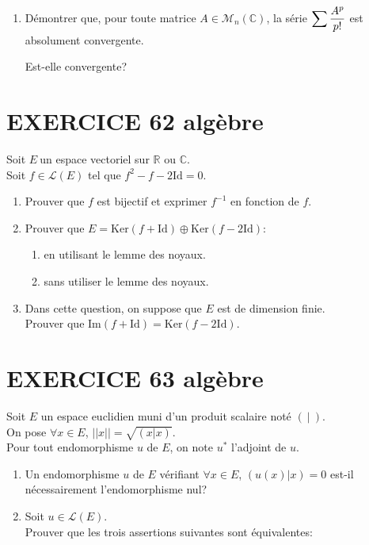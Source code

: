 \documentclass[10pt,oneside]{article}
\begin{document}
\begin{flushleft}
\begin{enumerate}
\item Démontrer que, pour toute matrice $A\in \mathcal{M}_{n}\left( \mathbb{C}\right)$, la s\'{e}rie $\displaystyle\displaystyle\sum \dfrac{A^{p}}{p!}$ est absolument convergente.

Est-elle convergente?
\end{enumerate}
		


\section*{EXERCICE 62 \: algèbre }

Soit $E\ $un espace vectoriel sur $\mathbb{R}$ ou $\mathbb{C}$.\\
Soit $f\in\mathcal{L}(E)$ tel que $f^2-f-2\mathrm{Id}=0$.\\

\begin{enumerate}
\item 
 Prouver que $f$ est bijectif et exprimer $f^{-1}$ en fonction de $f$.\\
\item
Prouver que $E=\mathrm{Ker} (f+\mathrm{Id})\oplus\mathrm{Ker}(f-2\mathrm{Id})$:
\begin{enumerate}
\item
en utilisant le lemme des noyaux.
\item
sans utiliser le lemme des noyaux.
\end{enumerate}
\item
Dans cette question, on suppose que $E$ est de dimension finie.\\
Prouver que $\mathrm{Im}(f+\mathrm{Id})=\mathrm{Ker}(f-2\mathrm{Id})$.
\end{enumerate}
\section*{EXERCICE 63 \: algèbre }


Soit $E$ un espace euclidien muni d'un produit scalaire noté $(\:|\:)$.\\
On pose $\forall x\in E$, $||x||=\sqrt{(x|x)}$.\\
Pour tout endomorphisme $u$ de $E$, on note $u^*$ l'adjoint de $u$.
\begin{enumerate}
\item

Un endomorphisme $u$ de $E$ vérifiant $\forall x\in E$, $(u(x)|x)=0$ est-il nécessairement l'endomorphisme nul?
\item
Soit $u\in \mathcal{L}(E)$.\\
Prouver que les trois assertions suivantes sont équivalentes:\\


\end{enumerate}
\end{flushleft}
\end{document}
